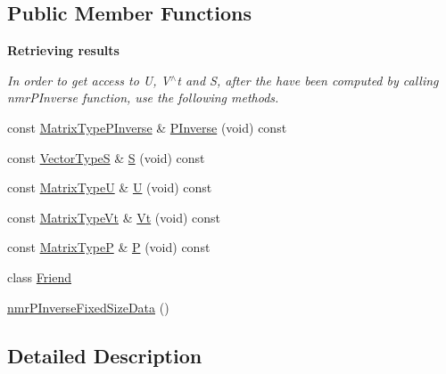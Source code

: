 \subsection*{Public Member Functions}
\begin{Indent}{\bf Retrieving results}\par
{\em In order to get access to U, V$^\wedge$t and S, after the have been computed by calling nmr\+P\+Inverse function, use the following methods. }\begin{DoxyCompactItemize}
\item 
const \hyperlink{classnmr_p_inverse_fixed_size_data_a6c4787ecd9e2e7155fd857fb4427c7b0}{Matrix\+Type\+P\+Inverse} \& \hyperlink{classnmr_p_inverse_fixed_size_data_a2f7b17c39f8ee3c5507a9972cd71cdd4}{P\+Inverse} (void) const 
\item 
const \hyperlink{classnmr_p_inverse_fixed_size_data_a55ba424dddf7bd0797b80bc468a209b0}{Vector\+Type\+S} \& \hyperlink{classnmr_p_inverse_fixed_size_data_a2c50698928453067de9a6aba235c4897}{S} (void) const 
\item 
const \hyperlink{classnmr_p_inverse_fixed_size_data_aef6864d119646cca01fc7a27d9eec4fa}{Matrix\+Type\+U} \& \hyperlink{classnmr_p_inverse_fixed_size_data_a71645b7e6188fe5a505f675462641f24}{U} (void) const 
\item 
const \hyperlink{classnmr_p_inverse_fixed_size_data_a61bc7c8325cf61f5c530759364ce185a}{Matrix\+Type\+Vt} \& \hyperlink{classnmr_p_inverse_fixed_size_data_a30eb8478f5f2baab309d3e288c8f99f3}{Vt} (void) const 
\item 
const \hyperlink{classnmr_p_inverse_fixed_size_data_abbeb86284eb856bc18f108e80906b04d}{Matrix\+Type\+P} \& \hyperlink{classnmr_p_inverse_fixed_size_data_a34cb376766bae89c6530a699dca4e04a}{P} (void) const 
\end{DoxyCompactItemize}
\end{Indent}
\begin{DoxyCompactItemize}
\item 
class \hyperlink{classnmr_p_inverse_fixed_size_data_a7f8321d57e81bc613d5dbef3410ba70e}{Friend}
\item 
\hyperlink{classnmr_p_inverse_fixed_size_data_a48c00a3fc941733de8cfb894b36802b2}{nmr\+P\+Inverse\+Fixed\+Size\+Data} ()
\end{DoxyCompactItemize}


\subsection{Detailed Description}
